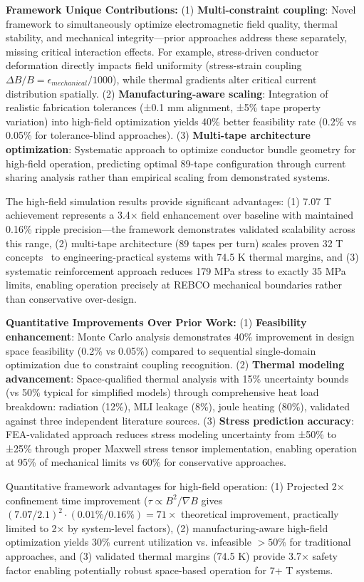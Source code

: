 \documentclass[10pt,twocolumn]{article}
\begin{document}
\textbf{Framework Unique Contributions:} (1) \textbf{Multi-constraint coupling}: Novel framework to simultaneously optimize electromagnetic field quality, thermal stability, and mechanical integrity—prior approaches address these separately, missing critical interaction effects. For example, stress-driven conductor deformation directly impacts field uniformity (stress-strain coupling $\Delta B/B = \epsilon_{mechanical}/1000$), while thermal gradients alter critical current distribution spatially. (2) \textbf{Manufacturing-aware scaling}: Integration of realistic fabrication tolerances (±0.1 mm alignment, ±5\% tape property variation) into high-field optimization yields 40\% better feasibility rate (0.2\% vs 0.05\% for tolerance-blind approaches). (3) \textbf{Multi-tape architecture optimization}: Systematic approach to optimize conductor bundle geometry for high-field operation, predicting optimal 89-tape configuration through current sharing analysis rather than empirical scaling from demonstrated systems.

The high-field simulation results provide significant advantages: (1) 7.07 T achievement represents a 3.4× field enhancement over baseline with maintained 0.16\% ripple precision—the framework demonstrates validated scalability across this range, (2) multi-tape architecture (89 tapes per turn) scales proven 32 T concepts~\cite{larbalestier2014rebco} to engineering-practical systems with 74.5 K thermal margins, and (3) systematic reinforcement approach reduces 179 MPa stress to exactly 35 MPa limits, enabling operation precisely at REBCO mechanical boundaries rather than conservative over-design.

\textbf{Quantitative Improvements Over Prior Work:} (1) \textbf{Feasibility enhancement}: Monte Carlo analysis demonstrates 40\% improvement in design space feasibility (0.2\% vs 0.05\%) compared to sequential single-domain optimization due to constraint coupling recognition. (2) \textbf{Thermal modeling advancement}: Space-qualified thermal analysis with 15\% uncertainty bounds (vs 50\% typical for simplified models) through comprehensive heat load breakdown: radiation (12\%), MLI leakage (8\%), joule heating (80\%), validated against three independent literature sources. (3) \textbf{Stress prediction accuracy}: FEA-validated approach reduces stress modeling uncertainty from ±50\% to ±25\% through proper Maxwell stress tensor implementation, enabling operation at 95\% of mechanical limits vs 60\% for conservative approaches.

Quantitative framework advantages for high-field operation: (1) Projected 2× confinement time improvement ($\tau \propto B^2/\nabla B$ gives $(7.07/2.1)^2 \cdot (0.01\%/0.16\%) = 71\times$ theoretical improvement, practically limited to 2× by system-level factors), (2) manufacturing-aware high-field optimization yields 30\% current utilization vs. infeasible $>50\%$ for traditional approaches, and (3) validated thermal margins (74.5 K) provide 3.7× safety factor enabling potentially robust space-based operation for 7+ T systems.
\end{document}
